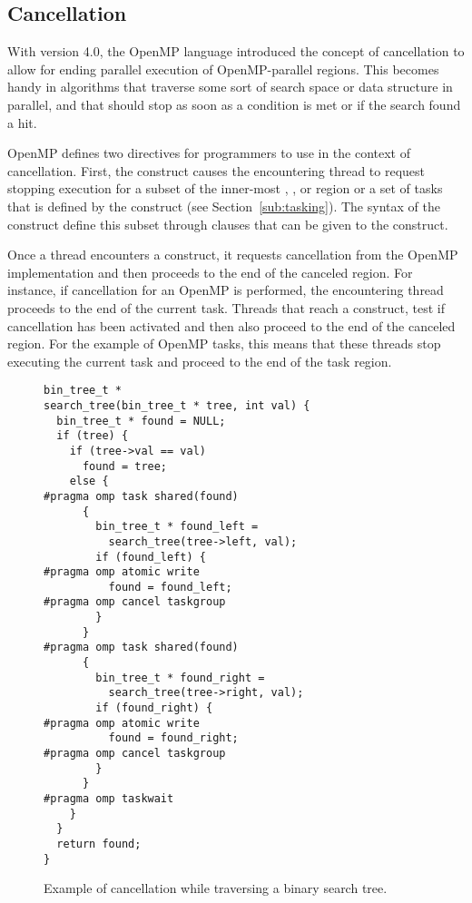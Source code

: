 \subsection{Cancellation}
\label{sec:Cancellation}
With version 4.0, the OpenMP language introduced the concept of cancellation to allow for ending parallel execution of OpenMP-parallel regions.
This becomes handy in algorithms that traverse some sort of search space or data structure in parallel, and that should stop as soon as a condition is met or if the search found a hit.

OpenMP defines two directives for programmers to use in the context of cancellation.
First, the  construct causes the encountering thread to request stopping execution for a subset of the inner-most , ,  or  region or a set of tasks that is defined by the  construct (see Section~\ref{sub:tasking}).  
The syntax of the  construct define this subset through clauses that can be given to the construct.

Once a thread encounters a  construct, it requests cancellation from the OpenMP implementation and then proceeds to the end of the canceled region.
For instance, if cancellation for an OpenMP  is performed, the encountering thread proceeds to the end of the current task.
Threads that reach a  construct, test if cancellation has been activated and then also proceed to the end of the canceled region.
For the example of OpenMP tasks, this means that these threads stop executing the current task and proceed to the end of the task region.

\begin{figure}
\begin{verbatim}
bin_tree_t *
search_tree(bin_tree_t * tree, int val) {
  bin_tree_t * found = NULL;
  if (tree) {
    if (tree->val == val)
      found = tree;
    else {
#pragma omp task shared(found)
      {
        bin_tree_t * found_left =
          search_tree(tree->left, val);
        if (found_left) {
#pragma omp atomic write
          found = found_left;
#pragma omp cancel taskgroup
        }
      }
#pragma omp task shared(found)
      {
        bin_tree_t * found_right =
          search_tree(tree->right, val);
        if (found_right) {
#pragma omp atomic write
          found = found_right;
#pragma omp cancel taskgroup
        }
      }
#pragma omp taskwait
    }
  }
  return found;
}
\end{verbatim}
\caption{Example of cancellation while traversing a binary search tree.\label{fig:Cancellation}}
\end{figure}

